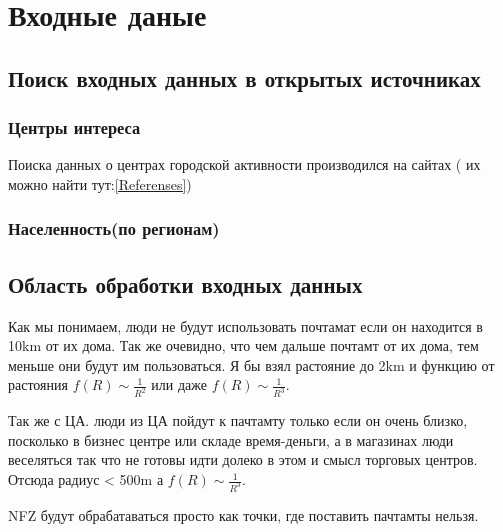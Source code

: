 \documentclass[12pt]{article} %
\begin{document}
 	\section{Входные даные}
 	\subsection{Поиск входных данных в открытых источниках}
 	\subsubsection{Центры интереса}
 	Поиска данных о центрах городской активности производился на сайтах ( их можно найти тут:\ref{Referenses})
 	\subsubsection{Населенность(по регионам)}
 	\subsection{Область обработки входных данных}
 	\hspace*{1cm} Как мы понимаем, люди не будут использовать почтамат если он находится в 10km от их дома. Так же очевидно, что чем дальше почтамт от их дома, тем меньше они будут им пользоваться. Я бы взял растояние до 2km и функцию от растояния $f(R)\sim\frac{1}{R^2}$ или даже $f(R)\sim\frac{1}{R^3}$.\par
 	 Так же с ЦА. люди из ЦА пойдут к пачтамту только если он очень близко, посколько в бизнес центре или складе время-деньги, а в магазинах люди веселяться так что не готовы идти долеко в этом и смысл торговых центров. Отсюда радиус < 500m а $f(R)\sim \frac{1}{R^3}$. \par 
 	 NFZ будут обрабатаваться просто как точки, где поставить пачтамты нельзя. 
\end{document}
